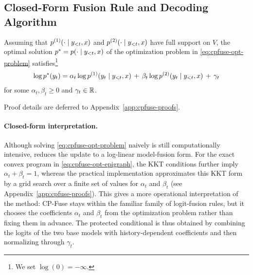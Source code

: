 \subsection{Closed-Form Fusion Rule and Decoding Algorithm}

\begin{lemma}
\label{lem:cpfuse-kkt}
Assuming that \(p^{(1)}(\cdot \mid y_{<t},x)\) and \(p^{(2)}(\cdot \mid y_{<t},x)\) have full support on \(V\), the optimal solution \(p^* = p(\cdot \mid y_{<t},x)\) of the optimization problem in \eqref{eq:cpfuse-opt-problem} satisfies\footnote{We set \(\log(0) = -\infty\).}
\begin{equation}
\label{eq:cpfuse-opt}
\log p^*(y_t)
=
\alpha_t \log p^{(1)}(y_t \mid y_{<t},x)
\,+\,
\beta_t \log p^{(2)}(y_t \mid y_{<t},x)
\,+\,
\gamma_t
\end{equation}
for some \(\alpha_t,\beta_t \geq 0\) and \(\gamma_t \in \mathbb{R}\).
\end{lemma}

Proof details are deferred to Appendix~\ref{app:cpfuse-proofs}.

\paragraph{Closed-form interpretation.}
Although solving \eqref{eq:cpfuse-opt-problem} naively is still computationally intensive,  reduces the update to a log-linear model-fusion form. For the exact convex program in \eqref{eq:cpfuse-opt-epigraph}, the KKT conditions further imply \(\alpha_t + \beta_t = 1\), whereas the practical implementation approximates this KKT form by a grid search over a finite set of values for \(\alpha_t\) and \(\beta_t\) (see Appendix~\ref{app:cpfuse-proofs}). This gives a more operational interpretation of the method: CP-Fuse stays within the familiar family of logit-fusion rules, but it chooses the coefficients \(\alpha_t\) and \(\beta_t\) from the optimization problem rather than fixing them in advance. The protected conditional is thus obtained by combining the logits of the two base models with history-dependent coefficients and then normalizing through \(\gamma_t\).

